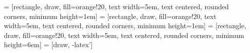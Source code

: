 
 = [rectangle, draw, fill=orange!20, 
    text width=5em, text centered, rounded corners, minimum height=1em]
 = [rectangle, draw, fill=orange!20, 
    text width=5em, text centered, rounded corners, minimum height=1em]
 = [rectangle, draw, fill=orange!20, 
    text width=5em, text centered, rounded corners, minimum height=6em]
 = [draw, -latex']
    

